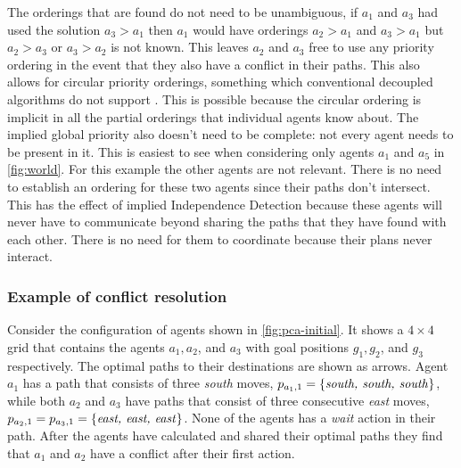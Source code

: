 The orderings that are found do not need to be unambiguous, if $a_1$ and $a_3$
had used the solution $a_3 > a_1$ then $a_1$ would have orderings $a_2 > a_1$
and $a_3 > a_1$ but $a_2 > a_3$ or $a_3 > a_2$ is not known. This leaves $a_2$ 
and $a_3$
free to use any priority ordering in the event that they also have a conflict in
their paths. This also allows for circular priority orderings, something which
conventional decoupled algorithms do not support \cite{bennewitz2002}. This is 
possible because the
circular ordering is implicit in all the partial orderings that individual
agents know about. The implied global priority also doesn't need to be
complete: not every agent needs to be present in it. This is easiest to see
when considering only agents $a_1$ and $a_5$ in \autoref{fig:world}. For this
example the other agents are not relevant. There is no need to establish an
ordering for these two agents since their paths don't intersect. This has the 
effect
of implied Independence Detection \cite{standley2010} because these agents will
never have to communicate beyond sharing the paths that they have found with
each other. There is no need for them to coordinate because their plans never
interact.


\subsubsection{Example of conflict resolution}

Consider the configuration of agents shown in \autoref{fig:pca-initial}. It 
shows a $4 \times 4$ grid that contains the agents $a_1, a_2$, and $a_3$ with 
goal positions $g_1, g_2$, and $g_3$ respectively. The optimal paths to their 
destinations are shown as arrows. Agent $a_1$ has a path that consists of three 
\emph{south} moves, $p_{a_1,1} = \{\text{\emph{south, south, south}}\}$, while 
both $a_2$ and $a_3$ have paths that consist of three consecutive \emph{east} 
moves, $p_{a_2,1} = p_{a_3,1} = \{\text{\emph{east, east, east}}\}$. None of 
the agents has a \emph{wait} action in their path. After the agents have 
calculated and shared 
their optimal paths they find that $a_1$ and $a_2$ have a conflict after their 
first action. 

